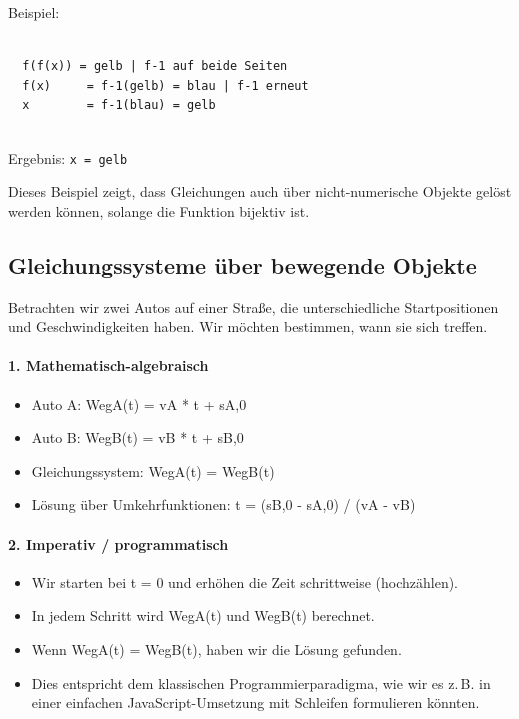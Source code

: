 \documentclass{article}
\begin{document}
Beispiel:

        \begin{verbatim}

  f(f(x)) = gelb | f-1 auf beide Seiten
  f(x)     = f-1(gelb) = blau | f-1 erneut
  x        = f-1(blau) = gelb
        
\end{verbatim}

        
Ergebnis: \texttt{x = gelb}


        
Dieses Beispiel zeigt, dass Gleichungen auch über nicht-numerische Objekte gelöst werden können, solange die Funktion bijektiv ist.


        \subsection{Gleichungssysteme über bewegende Objekte}
        
Betrachten wir zwei Autos auf einer Straße, die unterschiedliche Startpositionen und Geschwindigkeiten haben. Wir möchten bestimmen, wann sie sich treffen.


        \paragraph{1. Mathematisch-algebraisch}
        \begin{itemize}
          \item Auto A: WegA(t) = vA * t + sA,0

          \item Auto B: WegB(t) = vB * t + sB,0

          \item Gleichungssystem: WegA(t) = WegB(t)

          \item Lösung über Umkehrfunktionen: t = (sB,0 - sA,0) / (vA - vB)

        \end{itemize}

        \paragraph{2. Imperativ / programmatisch}
        \begin{itemize}
          \item Wir starten bei t = 0 und erhöhen die Zeit schrittweise (hochzählen).

          \item In jedem Schritt wird WegA(t) und WegB(t) berechnet.

          \item Wenn WegA(t) = WegB(t), haben wir die Lösung gefunden.

          \item Dies entspricht dem klassischen Programmierparadigma, wie wir es z.\,B. in einer einfachen JavaScript-Umsetzung mit Schleifen formulieren könnten.

        \end{itemize}
\end{document}
